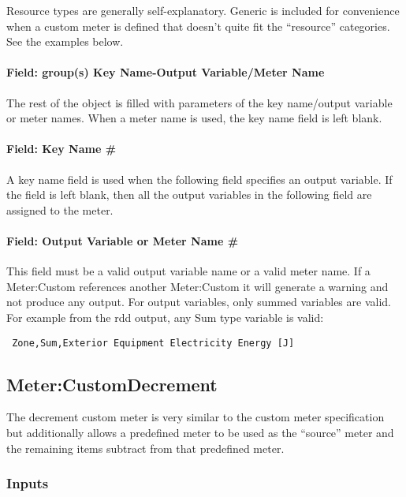 Resource types are generally self-explanatory. Generic is included for convenience when a custom meter is defined that doesn't quite fit the ``resource'' categories. See the examples below.

\paragraph{Field: group(s) Key Name-Output Variable/Meter Name}\label{field-groups-key-name-output-variablemeter-name}

The rest of the object is filled with parameters of the key name/output variable or meter names. When a meter name is used, the key name field is left blank.

\paragraph{Field: Key Name \#}\label{field-key-name}

A key name field is used when the following field specifies an output variable. If the field is left blank, then all the output variables in the following field are assigned to the meter.

\paragraph{Field: Output Variable or Meter Name \#}\label{field-output-variable-or-meter-name}

This field must be a valid output variable name or a valid meter name. If a Meter:Custom references another Meter:Custom it will generate a warning and not produce any output.
For output variables, only summed variables are valid. For example from the rdd output, any Sum type variable is valid:
\begin{lstlisting}
 Zone,Sum,Exterior Equipment Electricity Energy [J]
\end{lstlisting}

\subsection{Meter:CustomDecrement}\label{metercustomdecrement}

The decrement custom meter is very similar to the custom meter specification but additionally allows a predefined meter to be used as the ``source'' meter and the remaining items subtract from that predefined meter.

\subsubsection{Inputs}\label{inputs-18-008}

